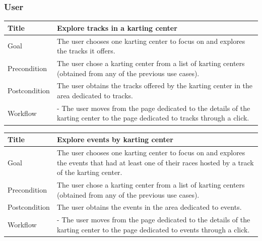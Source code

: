 \documentclass{beamer}
\begin{document}
\begin{frame}
    \frametitle{User}
    \begin{table}
        \tiny
        \begin{tabular}{|p{2cm}|p{6cm}|}
        \hline
        Title & \textbf{Explore tracks in a karting center} \\
        \hline
        Goal & The user chooses one karting center to focus on and explores the tracks it offers. \\
        \hline
        Precondition & The user chose a karting center from a list of karting centers (obtained from any of the previous use cases).\\
        \hline
        Postcondition & The user obtains the tracks offered by the karting center in the area dedicated to tracks. \\
        \hline
        Workflow &
        - The user moves from the page dedicated to the details of the karting center to the
        page dedicated to tracks through a click. \\
        \hline
        \end{tabular}
\end{table}

\begin{table}
    \tiny
    \begin{tabular}{|p{2cm}|p{6cm}|}
    \hline
    Title & \textbf{Explore events by karting center} \\
    \hline
    Goal & The user chooses one karting center to focus on and explores the events that had at least one 
    of their races hosted by a track of the karting center. \\
    \hline
    Precondition & The user chose a karting center from a list of karting centers (obtained from any of the previous use cases).\\
    \hline
    Postcondition & The user obtains the events in the area dedicated to events. \\
    \hline
    Workflow &
    - The user moves from the page dedicated to the details of the karting center to the
    page dedicated to events through a click. \\
    \hline
    \end{tabular}
\end{table}
\end{frame}


\end{document}
